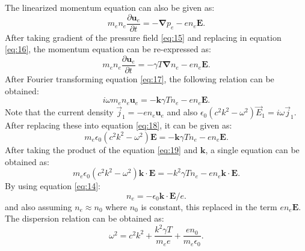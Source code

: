 \documentclass[11pt]{amsart}
\begin{document}
The linearized momentum equation can also be given as:
\begin{equation}
\label{eq:16}
m_e n_e \frac{\partial \mathbf{u}_e}{\partial t} =-\mathbf{\nabla}p_e- e n_e  \mathbf{E}.
\end{equation}
After taking gradient of the pressure field \ref{eq:15} and replacing in equation \ref{eq:16}, the momentum equation can be re-expressed as:
\begin{equation}
\label{eq:17}
m_e n_e \frac{\partial \mathbf{u}_e}{\partial t} =-\gamma T\mathbf{\nabla}n_e- e n_e  \mathbf{E}.
\end{equation}
After Fourier transforming equation \ref{eq:17}, the following relation can be obtained:
\begin{equation}
\label{eq:18}
i \omega m_e n_e  \mathbf{u}_e =-\mathbf{k}\gamma T n_e- e n_e  \mathbf{E}.
\end{equation}
Note that the current density $\vec{j}_1=-e n_e  \mathbf{u}_e$ and also $\epsilon_0(c^2 k^2 -\omega^2)\vec{E}_1 =i\omega \vec{j}_1$. After replacing these into equation \ref{eq:18}, it can be given as:
\begin{equation}
\label{eq:19}
m_e \epsilon_0(c^2 k^2 -\omega^2)\mathbf{E} =-\mathbf{k}\gamma T n_e- e n_e  \mathbf{E}.
\end{equation}
After taking the product of the equation \ref{eq:19} and $\mathbf{k}$, a single equation can be obtained as:
\begin{equation}
\label{eq:19}
m_e \epsilon_0(c^2 k^2 -\omega^2)\mathbf{k}\cdot\mathbf{E} =-k^2\gamma T n_e- e n_e  \mathbf{k}\cdot\mathbf{E}.
\end{equation}
By using equation \ref{eq:14}:
\begin{equation}
\label{eq:20}
n_e=-\epsilon_0 \mathbf{k}\cdot\mathbf{E}/e.
\end{equation}
and also assuming $n_e \approx n_0$ where $n_0$ is constant, this replaced in the term $e n_e  \mathbf{E}$. The dispersion relation can be obtained as:
\begin{equation}
\label{eq:21}
\omega^2=c^2 k^2+ \frac{ k^2\gamma T }{m_e  e}+\frac{e n_0 }{m_e \epsilon_0}.
\end{equation}
\end{document}
